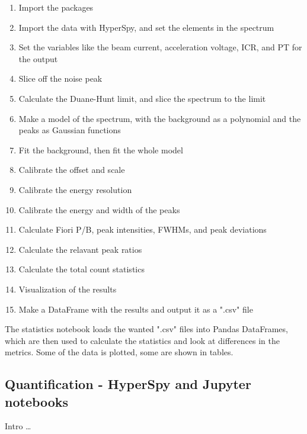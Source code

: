 \begin{enumerate}
    \item Import the packages
    \item Import the data with HyperSpy, and set the elements in the spectrum
    \item Set the variables like the beam current, acceleration voltage, ICR, and PT for the output
    \item Slice off the noise peak
    \item Calculate the Duane-Hunt limit, and slice the spectrum to the limit
    \item Make a model of the spectrum, with the background as a polynomial and the peaks as Gaussian functions
    \item Fit the background, then fit the whole model
    \item Calibrate the offset and scale
    \item Calibrate the energy resolution
    \item Calibrate the energy and width of the peaks
    \item Calculate Fiori P/B, peak intensities, FWHMs, and peak deviations
    \item Calculate the relavant peak ratios
    \item Calculate the total count statistics
    \item Visualization of the results
    \item Make a DataFrame with the results and output it as a ".csv" file
\end{enumerate}



The statistics notebook loads the wanted ".csv" files into Pandas DataFrames, which are then used to calculate the statistics and look at differences in the metrics.
Some of the data is plotted, some are shown in tables.


























\subsection{Quantification - HyperSpy and Jupyter notebooks}
\label{method:data_treatment:quantification}


Intro \dots




